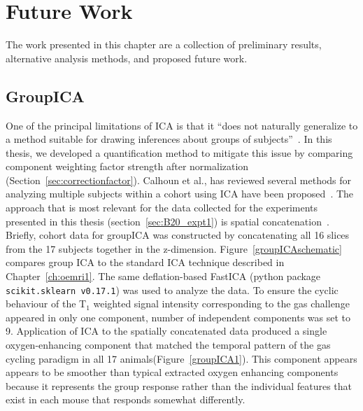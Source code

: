 
\chapter{Future Work}
\label{ch:futurework}

The work presented in this chapter are a collection of preliminary results, alternative analysis methods, and proposed future work. 

\section{GroupICA}

One of the principal limitations of \acs{ICA} is that it ``does not naturally generalize to a method suitable for drawing inferences about groups of subjects''~\cite{Calhoun:2009jr}.
In this thesis, we developed a quantification method to mitigate this issue by comparing component weighting factor strength after normalization (Section~\ref{sec:correctionfactor}).
Calhoun et al., has reviewed several methods for analyzing multiple subjects within a cohort using \acs{ICA} have been proposed~\cite{Calhoun:2009jr}.
The approach that is most relevant for the data collected for the experiments presented in this thesis (section~\ref{sec:B20_expt1}) is spatial concatenation~\cite{Calhoun:2001jx}.
Briefly, cohort data for groupICA was constructed by concatenating all 16 slices from the 17 subjects together in the z-dimension.
Figure~\ref{groupICAschematic} compares group ICA to the standard ICA technique described in Chapter~\ref{ch:oemri1}.
The same deflation-based \acs{FastICA} (python package \texttt{scikit.sklearn v0.17.1}) was used to analyze the data.
To ensure the cyclic behaviour of the T$_1$ weighted signal intensity corresponding to the gas challenge appeared in only one component, number of independent components was set to 9.
Application of \acs{ICA} to the spatially concatenated data produced a single oxygen-enhancing component that matched the temporal pattern of the gas cycling paradigm in all 17 animals(Figure~\ref{groupICA1}). 
This component appears appears to be smoother than typical extracted oxygen enhancing components because it represents the group response rather than the individual features that exist in each mouse that responds somewhat differently.

